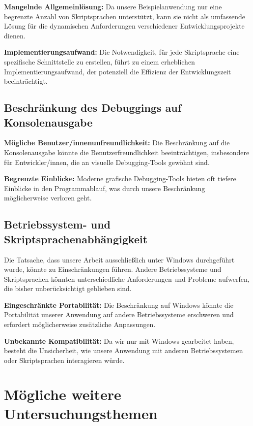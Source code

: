 \textbf{Mangelnde Allgemeinlösung:} Da unsere Beispielanwendung nur eine begrenzte Anzahl von 
Skriptsprachen unterstützt, kann sie nicht als umfassende Lösung für die dynamischen Anforderungen 
verschiedener Entwicklungsprojekte dienen.

\textbf{Implementierungsaufwand:} Die Notwendigkeit, für jede Skriptsprache eine spezifische 
Schnittstelle zu erstellen, führt zu einem erheblichen Implementierungsaufwand, der potenziell 
die Effizienz der Entwicklungszeit beeinträchtigt.

\subsection*{Beschränkung des Debuggings auf Konsolenausgabe}

\textbf{Mögliche Benutzer/innenunfreundlichkeit:} Die Beschränkung auf die Konsolenausgabe könnte 
die Benutzerfreundlichkeit beeinträchtigen, insbesondere für Entwickler/innen, die an visuelle 
Debugging-Tools gewöhnt sind.

\textbf{Begrenzte Einblicke:} Moderne grafische Debugging-Tools bieten oft tiefere Einblicke 
in den Programmablauf, was durch unsere Beschränkung möglicherweise verloren geht.

\newpage

\subsection*{Betriebssystem- und Skriptsprachenabhängigkeit}

Die Tatsache, dass unsere Arbeit ausschließlich unter Windows durchgeführt wurde, 
könnte zu Einschränkungen führen. Andere Betriebssysteme und Skriptsprachen könnten 
unterschiedliche Anforderungen und Probleme aufwerfen, die bisher unberücksichtigt geblieben sind.

\textbf{Eingeschränkte Portabilität:} Die Beschränkung auf Windows könnte die Portabilität unserer 
Anwendung auf andere Betriebssysteme erschweren und erfordert möglicherweise zusätzliche Anpassungen.

\textbf{Unbekannte Kompatibilität:} Da wir nur mit Windows gearbeitet haben, 
besteht die Unsicherheit, wie unsere Anwendung mit anderen Betriebssystemen oder Skriptsprachen 
interagieren würde.

\newpage
\section{Mögliche weitere Untersuchungsthemen}


